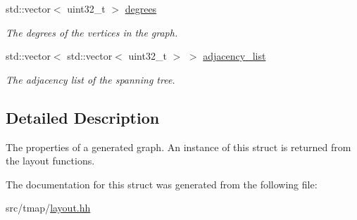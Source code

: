 \begin{DoxyCompactItemize}
std\+::vector$<$ uint32\+\_\+t $>$ \hyperlink{structGraphProperties_ae1515b9c7e47a9ed3034bb219871d1c1}{degrees}
\begin{DoxyCompactList}\small\item\em The degrees of the vertices in the graph. \end{DoxyCompactList}\item 
\mbox{\label{structGraphProperties_ab567d40199d8d3e6a4a96e8c145df635}} 
std\+::vector$<$ std\+::vector$<$ uint32\+\_\+t $>$ $>$ \hyperlink{structGraphProperties_ab567d40199d8d3e6a4a96e8c145df635}{adjacency\+\_\+list}
\begin{DoxyCompactList}\small\item\em The adjacency list of the spanning tree. \end{DoxyCompactList}\end{DoxyCompactItemize}


\subsection{Detailed Description}
The properties of a generated graph. An instance of this struct is returned from the layout functions. 

The documentation for this struct was generated from the following file\+:\begin{DoxyCompactItemize}
\item 
src/tmap/\hyperlink{layout_8hh}{layout.\+hh}\end{DoxyCompactItemize}
